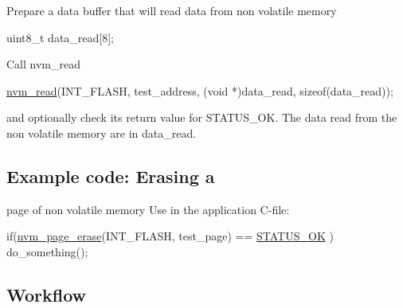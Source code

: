 \begin{DoxyEnumerate}
\item Prepare a data buffer that will read data from non volatile memory 
\begin{DoxyCode}
 uint8\_t data\_read[8]; 
\end{DoxyCode}

\item Call nvm\-\_\-read 
\begin{DoxyCode}
 \hyperlink{xmega__nvm_8c_a38c20e73ee79e686204f85e88854e5d1}{nvm\_read}(INT\_FLASH, test\_address, (\textcolor{keywordtype}{void} *)data\_read,
         \textcolor{keyword}{sizeof}(data\_read)); 
\end{DoxyCode}
 and optionally check its return value for S\-T\-A\-T\-U\-S\-\_\-\-O\-K. The data read from the non volatile memory are in data\-\_\-read.
\end{DoxyEnumerate}\hypertarget{common_nvm_quickstart_nvm_basic_use_case_usage_code_erasing}{}\subsection{Example code\-: Erasing a}\label{common_nvm_quickstart_nvm_basic_use_case_usage_code_erasing}
page of non volatile memory Use in the application C-\/file\-: 
\begin{DoxyCode}
        \textcolor{keywordflow}{if}(\hyperlink{xmega__nvm_8c_a647ad906f2c90020d68084b0d3c7c206}{nvm\_page\_erase}(INT\_FLASH, test\_page) == \hyperlink{group__group__xmega__utils__status__codes_gga751c892e5a46b8e7d282085a5a5bf151a7e4a42e3b6dd63708c64cf3db6f69566}{STATUS\_OK}
      )
          do\_something();
\end{DoxyCode}
\hypertarget{common_nvm_quickstart_nvm_basic_use_case_usage_flow}{}\subsection{Workflow}\label{common_nvm_quickstart_nvm_basic_use_case_usage_flow}

